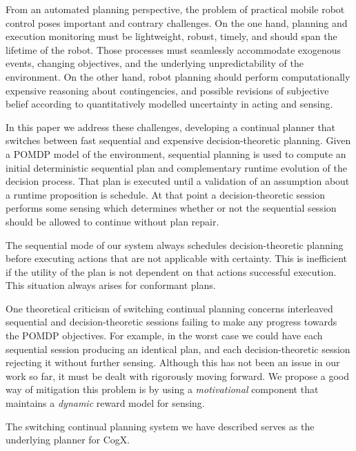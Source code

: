

From an automated planning perspective, the problem of practical
mobile robot control poses important and contrary challenges.
On the one hand, planning and execution monitoring must be
lightweight, robust, timely, and should span the lifetime of the
robot. Those processes must seamlessly accommodate exogenous events,
changing objectives, and the underlying unpredictability of the
environment.
On the other hand, robot planning should perform computationally
expensive reasoning about contingencies, and possible revisions of
subjective belief according to quantitatively modelled uncertainty in
acting and sensing. 

In this paper we address these challenges, developing a continual
planner that switches between fast sequential and expensive
decision-theoretic planning. Given a POMDP model of the environment,
sequential planning is used to compute an initial deterministic
sequential plan and complementary runtime evolution of the decision
process. That plan is executed until a validation of an assumption
about a runtime proposition is schedule. At that point a
decision-theoretic session performs some sensing which determines
whether or not the sequential session should be allowed to continue
without plan repair. 


The sequential mode of our system always schedules decision-theoretic
planning before executing actions that are not applicable with
certainty. This is inefficient if the utility of the plan is not
dependent on that actions successful execution. This situation always
arises for conformant plans. 


One theoretical criticism of switching continual planning concerns
interleaved sequential and decision-theoretic sessions failing to make
any progress towards the POMDP objectives. For example, in the worst
case we could have each sequential session producing an identical
plan, and each decision-theoretic session rejecting it without further
sensing. Although this has not been an issue in our work so far, it
must be dealt with rigorously moving forward. We propose a good way of
mitigation this problem is by using a {\em motivational} component
that maintains a {\em dynamic} reward model for sensing.






The switching continual planning system we have described serves as
the underlying planner for CogX.




